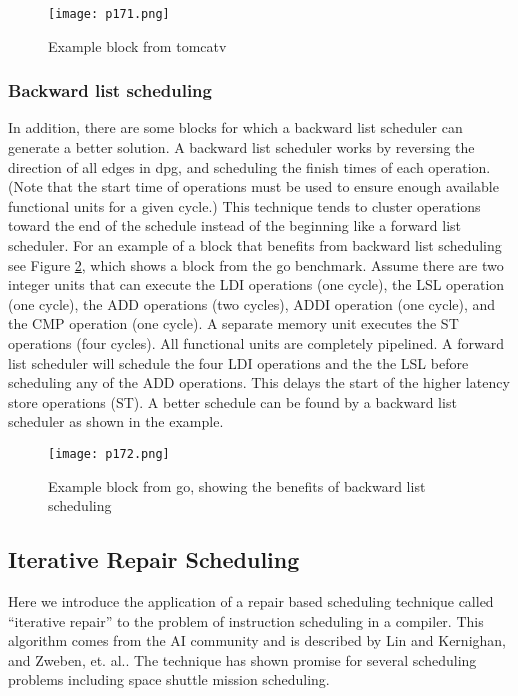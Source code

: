\begin{figure}[H]
	\centering
	\texttt{[image: p171.png]}
	\caption{Example block from tomcatv}
	\label{fig:p171}
\end{figure}

\subsubsection{Backward list scheduling}
In addition, there are some blocks for which a backward list scheduler can generate a better solution. A
backward list scheduler works by reversing the direction of all edges in dpg, and scheduling the finish times
of each operation. (Note that the start time of operations must be used to ensure enough available functional
units for a given cycle.) This technique tends to cluster operations toward the end of the schedule instead
of the beginning like a forward list scheduler. For an example of a block that benefits from backward list
scheduling see Figure \ref{fig:p172}, which shows a block from the go benchmark. Assume there are two integer units
that can execute the LDI operations (one cycle), the LSL operation (one cycle), the ADD operations (two
cycles), ADDI operation (one cycle), and the CMP operation (one cycle). A separate memory unit executes
the ST operations (four cycles). All functional units are completely pipelined. A forward list scheduler will
schedule the four LDI operations and the the LSL before scheduling any of the ADD operations. This delays
the start of the higher latency store operations (ST). A better schedule can be found by a backward list
scheduler as shown in the example.

\begin{figure}[H]
	\centering
	\texttt{[image: p172.png]}
	\caption{Example block from go, showing the benefits of backward list scheduling}
	\label{fig:p172}
\end{figure}


\subsection{Iterative Repair Scheduling}


Here we introduce the application of a repair based scheduling technique called “iterative repair” to the
problem of instruction scheduling in a compiler. This algorithm comes from the AI community and is described by Lin and
Kernighan\cite{lin1973effective}, and Zweben, et. al.\cite{zweben1992scheduling,zweben1992learning}. The technique has shown promise for several
scheduling problems including space shuttle mission scheduling.

